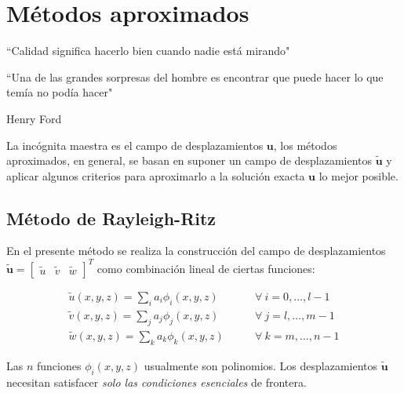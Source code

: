 \setchapterpreamble[u]{\margintoc}

\chapter{Métodos aproximados} \label{chap:aproximados}

\begin{kaobox}
	``Calidad significa hacerlo bien cuando nadie está mirando"
	
	``Una de las grandes sorpresas del hombre es encontrar que puede hacer lo que temía no podía hacer"
	\begin{flushright}
		Henry Ford
	\end{flushright}
\end{kaobox}

La incógnita maestra es el campo de desplazamientos $\mathbf{u}$, los métodos aproximados, en general, se basan en suponer un campo de desplazamientos $\tilde{\mathbf{u}}$ y aplicar algunos criterios para aproximarlo a la solución exacta $\mathbf{u}$ lo mejor posible.

\section{Método de Rayleigh-Ritz}

En el presente método se realiza la construcción del campo de desplazamientos $\tilde{\mathbf{u}} = \begin{bmatrix}
	\tilde{u} & \tilde{v} & \tilde{w}
\end{bmatrix}^T$ como combinación lineal de ciertas funciones:

\begin{equation}
	\begin{split}
		\tilde{u}(x, y, z) = \sum_i a_i \phi_i(x, y, z) & \qquad \forall \ i = 0, \dots, l-1\\
		\tilde{v}(x, y, z) = \sum_j a_j \phi_j(x, y, z) & \qquad \forall \ j = l, \dots, m - 1 \\
		\tilde{w}(x, y, z) = \sum_k a_k \phi_k(x, y, z) & \qquad \forall \ k = m, \dots, n - 1
	\end{split}
\end{equation}

Las $n$ funciones $\phi_i(x, y, z)$ usualmente son polinomios. Los desplazamientos $\tilde{\mathbf{u}}$ necesitan satisfacer \textit{solo las condiciones esenciales} de frontera.

